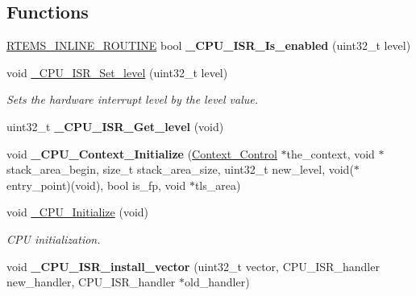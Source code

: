 \subsection*{Functions}
\begin{DoxyCompactItemize}
\item 
\mbox{\label{group__RTEMSScoreCPUARM_ga5254669b54a06e96ebb585fd50a02c4d}} 
\mbox{\hyperlink{group__RTEMSScoreBaseDefs_gac216239df231d5dbd15e3520b0b9313f}{R\+T\+E\+M\+S\+\_\+\+I\+N\+L\+I\+N\+E\+\_\+\+R\+O\+U\+T\+I\+NE}} bool {\bfseries \+\_\+\+C\+P\+U\+\_\+\+I\+S\+R\+\_\+\+Is\+\_\+enabled} (uint32\+\_\+t level)
\item 
void \mbox{\hyperlink{group__RTEMSScoreCPUARM_ga43820ba3d51d7a699c22fce8cac93ef1}{\+\_\+\+C\+P\+U\+\_\+\+I\+S\+R\+\_\+\+Set\+\_\+level}} (uint32\+\_\+t level)
\begin{DoxyCompactList}\small\item\em Sets the hardware interrupt level by the level value. \end{DoxyCompactList}\item 
\mbox{\label{group__RTEMSScoreCPUARM_ga1d9dcab9170d532b6634a5620385adbd}} 
uint32\+\_\+t {\bfseries \+\_\+\+C\+P\+U\+\_\+\+I\+S\+R\+\_\+\+Get\+\_\+level} (void)
\item 
\mbox{\label{group__RTEMSScoreCPUARM_gaa92701994ad8e3b646667a3e92935ddf}} 
void {\bfseries \+\_\+\+C\+P\+U\+\_\+\+Context\+\_\+\+Initialize} (\mbox{\hyperlink{structContext__Control}{Context\+\_\+\+Control}} $\ast$the\+\_\+context, void $\ast$stack\+\_\+area\+\_\+begin, size\+\_\+t stack\+\_\+area\+\_\+size, uint32\+\_\+t new\+\_\+level, void($\ast$entry\+\_\+point)(void), bool is\+\_\+fp, void $\ast$tls\+\_\+area)
\item 
void \mbox{\hyperlink{group__RTEMSScoreCPUARM_ga869484e3d851b032fd826c69ff21fc72}{\+\_\+\+C\+P\+U\+\_\+\+Initialize}} (void)
\begin{DoxyCompactList}\small\item\em C\+PU initialization. \end{DoxyCompactList}\item 
\mbox{\label{group__RTEMSScoreCPUARM_gaa3480454768ad843ce97909111a48a1f}} 
void {\bfseries \+\_\+\+C\+P\+U\+\_\+\+I\+S\+R\+\_\+install\+\_\+vector} (uint32\+\_\+t vector, C\+P\+U\+\_\+\+I\+S\+R\+\_\+handler new\+\_\+handler, C\+P\+U\+\_\+\+I\+S\+R\+\_\+handler $\ast$old\+\_\+handler)

\end{DoxyCompactItemize}
